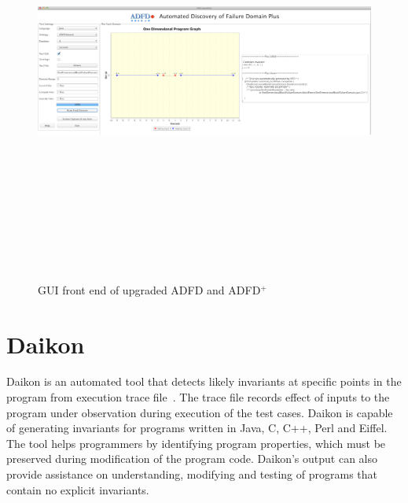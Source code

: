 \begin{figure}
\centering
\centerline{\includegraphics[width=22cm,height=14cm]{chapter7/adfdUpgraded1.png}}
\caption{GUI front end of upgraded ADFD and ADFD$^+$}
\label{fig:adfdUpgraded}
\end{figure}



\clearpage
\newpage
\section{Daikon}
Daikon is an automated tool that detects likely invariants at specific points in the program from execution trace file~\cite{ernst2007daikon}. The trace file records effect of inputs to the program under observation during execution of the test cases. Daikon is capable of generating invariants for programs written in Java, C, C++, Perl and Eiffel. The tool helps programmers by identifying program properties, which must be preserved during modification of the program code. Daikon's output can also provide assistance on understanding, modifying and testing of programs that contain no explicit invariants.

